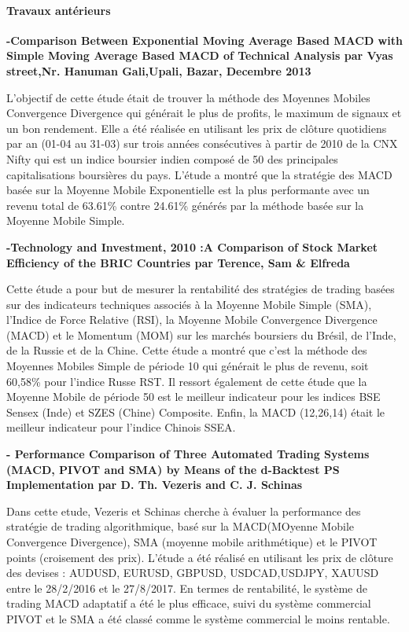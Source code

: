 \paragraph{Travaux antérieurs}\label{travaux-antuxe9rieurs}

\textbf{-Comparison Between Exponential Moving Average Based MACD with
Simple Moving Average Based MACD of Technical Analysis par Vyas
street,Nr. Hanuman Gali,Upali, Bazar, Decembre 2013}

{L'objectif de cette étude était de trouver la méthode des Moyennes
Mobiles Convergence Divergence qui générait le plus de profits, le
maximum de signaux et un bon rendement. Elle a été réalisée en utilisant
les prix de clôture quotidiens par an (01-04 au 31-03) sur trois années
consécutives à partir de 2010 de la CNX Nifty qui est un indice boursier
indien composé de 50 des principales capitalisations boursières du pays.
L'étude a montré que la stratégie des MACD basée sur la Moyenne Mobile
Exponentielle est la plus performante avec un revenu total de 63.61\%
contre 24.61\% générés par la méthode basée sur la Moyenne Mobile
Simple.}

\textbf{-Technology and Investment, 2010 :A Comparison of Stock Market
Efficiency of the BRIC Countries par Terence, Sam \& Elfreda}

{Cette étude a pour but de mesurer la rentabilité des stratégies de
trading basées sur des indicateurs techniques associés à la Moyenne
Mobile Simple (SMA), l'Indice de Force Relative (RSI), la Moyenne Mobile
Convergence Divergence (MACD) et le Momentum (MOM) sur les marchés
boursiers du Brésil, de l'Inde, de la Russie et de la Chine. Cette étude
a montré que c'est la méthode des Moyennes Mobiles Simple de période 10
qui générait le plus de revenu, soit 60,58\% pour l'indice Russe RST. Il
ressort également de cette étude que la Moyenne Mobile de période 50 est
le meilleur indicateur pour les indices BSE Sensex (Inde) et SZES
(Chine) Composite. Enfin, la MACD (12,26,14) était le meilleur
indicateur pour l'indice Chinois SSEA.}

\textbf{- Performance Comparison of Three Automated Trading Systems
(MACD, PIVOT and SMA) by Means of the d-Backtest PS Implementation par
D. Th. Vezeris and C. J. Schinas}

{Dans cette etude, Vezeris et Schinas cherche à évaluer la performance
des stratégie de trading algorithmique, basé sur la MACD(MOyenne Mobile
Convergence Divergence), SMA (moyenne mobile arithmétique) et le PIVOT
points (croisement des prix). L'étude a été réalisé en utilisant les
prix de clôture des devises : AUDUSD, EURUSD, GBPUSD, USDCAD,USDJPY,
XAUUSD entre le 28/2/2016 et le 27/8/2017. En termes de rentabilité, le
système de trading MACD adaptatif a été le plus efficace, suivi du
système commercial PIVOT et le SMA a été classé comme le système
commercial le moins rentable.}

